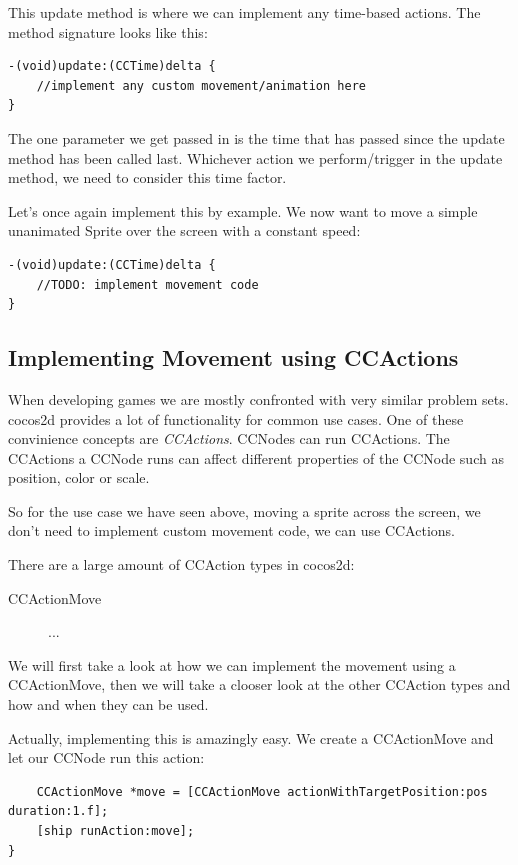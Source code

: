 \documentclass{scrreprt}
\newcommand{\cocos}{cocos2d}
\begin{document}
This update method is where we can implement any time-based actions. The method
signature looks like this:

\begin{lstlisting}
-(void)update:(CCTime)delta {
	//implement any custom movement/animation here
}
\end{lstlisting}

The one parameter we get passed in is the time that has passed since the update
method has been called last. Whichever action we perform/trigger in the update
method, we need to consider this time factor.

Let's once again implement this by example. We now want to move a simple
unanimated Sprite over the screen with a constant speed:

\begin{lstlisting}
-(void)update:(CCTime)delta {
	//TODO: implement movement code
}
\end{lstlisting}

\subsection{Implementing Movement using CCActions}
When developing games we are mostly confronted with very similar problem sets.
\cocos{} provides a lot of functionality for common use cases. One of these
convinience concepts are \textit{CCActions}. CCNodes can run CCActions. The
CCActions a CCNode runs can affect different properties of the CCNode such as
position, color or scale.

So for the use case we have seen above, moving a sprite across the screen, we
don't need to implement custom movement code, we can use CCActions.

There are a large amount of CCAction types in \cocos{}:
\begin{description}
  \item[CCActionMove] ...
\end{description}

We will first take a look at how we can implement the movement using a
CCActionMove, then we will take a clooser look at the other CCAction types and
how and when they can be used.

Actually, implementing this is amazingly easy. We create a CCActionMove and let
our CCNode run this action:
\begin{lstlisting}
	CCActionMove *move = [CCActionMove actionWithTargetPosition:pos duration:1.f];
	[ship runAction:move];
}
\end{lstlisting}
\end{document}

